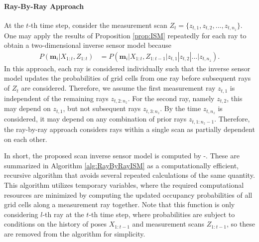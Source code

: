 \paragraph{Ray-By-Ray Approach}

At the $t$-th time step, consider the measurement scan $Z_t=\{z_{t,1},z_{t,2},...,z_{t,n_z}\}$. One may apply the results of Proposition \ref{prop:ISM} repeatedly for each ray to obtain a two-dimensional inverse sensor model because
\begin{align}
\label{eqn:RayByRayScanISM}
P(\mathbf{m}_i|X_{1:t},Z_{1:t})&%
=P(\mathbf{m}_i|X_{1:t},Z_{1:t-1}|z_{t,1}|z_{t,2}|...|z_{t,n_z}).
\end{align}
In this approach, each ray is considered individually such that the inverse sensor model updates the probabilities of grid cells from one ray before subsequent rays of $Z_t$ are considered. Therefore, we assume the first measurement ray $z_{t,1}$ is independent of the remaining rays $z_{t,2:n_z}$. For the second ray, namely $z_{t,2}$, this may depend on $z_{t,1}$, but not subsequent rays $z_{t,3:n_z}$. By the time $z_{t,n_z}$ is considered, it may depend on any combination of prior rays $z_{t,1:n_z-1}$. Therefore, the ray-by-ray approach considers rays within a single scan as partially dependent on each other.

In short, the proposed scan inverse sensor model is computed by -. These are summarized in Algorithm \ref{alg:RayByRayISM} as a computationally efficient, recursive algorithm that avoids several repeated calculations of the same quantity. This algorithm utilizes temporary variables, where the required computational resources are minimized by computing the updated occupancy probabilities of all grid cells along a measurement ray together. Note that this function is only considering $l$-th ray at the $t$-th time step, where probabilities are subject to conditions on the history of poses $X_{1:t-1}$ and measurement scans $Z_{1:t-1}$, so these are removed from the algorithm for simplicity.

